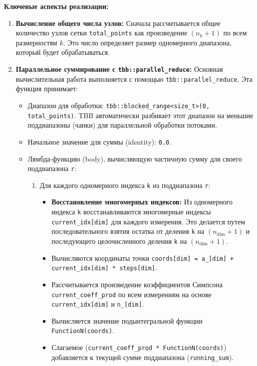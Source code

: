 \documentclass[a4paper,12pt]{article}
\begin{document}
\textbf{Ключевые аспекты реализации:}
\begin{enumerate}
    \item \textbf{Вычисление общего числа узлов:} Сначала рассчитывается общее количество узлов сетки \texttt{total\_points} как произведение $(n_k+1)$ по всем размерностям $k$. Это число определяет размер одномерного диапазона, который будет обрабатываться.
    \item \textbf{Параллельное суммирование с \texttt{tbb::parallel\_reduce}:}
        Основная вычислительная работа выполняется с помощью \texttt{tbb::parallel\_reduce}.
        Эта функция принимает:
        \begin{itemize}
            \item Диапазон для обработки: \texttt{tbb::blocked\_range<size\_t>(0, total\_points)}. TBB автоматически разбивает этот диапазон на меньшие поддиапазоны (чанки) для параллельной обработки потоками.
            \item Начальное значение для суммы (identity): \texttt{0.0}.
            \item Лямбда-функцию (body), вычисляющую частичную сумму для своего поддиапазона \texttt{r}:
                \begin{enumerate}
                    \item Для каждого одномерного индекса \texttt{k} из поддиапазона \texttt{r}:
                        \begin{itemize}
                            \item \textbf{Восстановление многомерных индексов:} Из одномерного индекса \texttt{k} восстанавливаются многомерные индексы \texttt{current\_idx[dim]} для каждого измерения. Это делается путем последовательного взятия остатка от деления \texttt{k} на $(n_{\text{dim}}+1)$ и последующего целочисленного деления \texttt{k} на $(n_{\text{dim}}+1)$.
                            \item Вычисляются координаты точки \texttt{coords[dim] = a\_[dim] + current\_idx[dim] * steps[dim]}.
                            \item Рассчитывается произведение коэффициентов Симпсона \texttt{current\_coeff\_prod} по всем измерениям на основе \texttt{current\_idx[dim]} и \texttt{n\_[dim]}.
                            \item Вычисляется значение подынтегральной функции \texttt{FunctionN(coords)}.
                            \item Слагаемое (\texttt{current\_coeff\_prod * FunctionN(coords)}) добавляется к текущей сумме поддиапазона (\texttt{running\_sum}).

\end{itemize}
\end{enumerate}
\end{itemize}
\end{enumerate}
\end{document}

